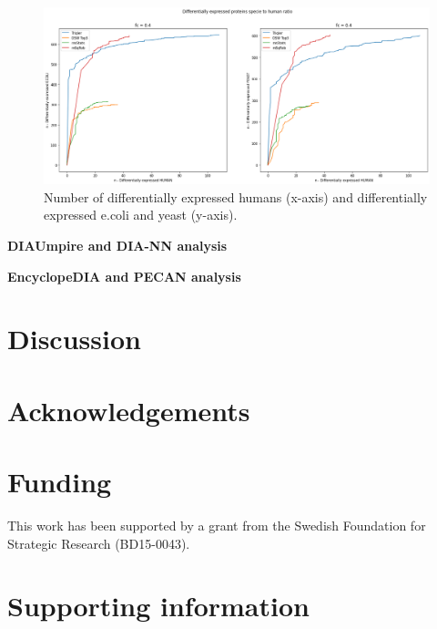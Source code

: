 \documentclass[10pt,letterpaper]{article}
\begin{document}
\begin{figure}[H]
    \centering
    \includegraphics[width=12cm]{../../result/2021-08-13_docs_plots/de_human_vs_de_specie.png}
    \caption{Number of differentially expressed humans (x-axis) and differentially expressed e.coli and yeast (y-axis).}
    \label{fig:osw_n_diff_exp}
\end{figure}



\textbf{DIAUmpire and DIA-NN analysis}

\textbf{EncyclopeDIA and PECAN analysis}


\section*{Discussion}

\section*{Acknowledgements}


\section*{Funding}

This work has been supported by a grant from the Swedish Foundation for Strategic Research (BD15-0043).

\section*{Supporting information}


%

\end{document}

